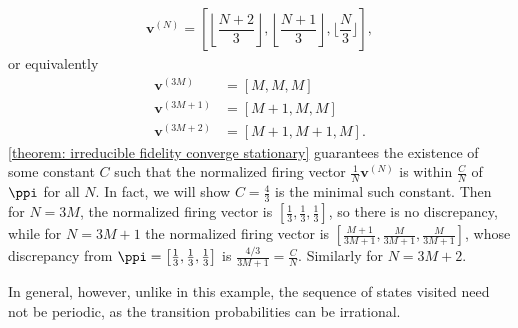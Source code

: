 \begin{example}
\begin{align*}
    \mathbf{v}^{(N)} = \left[\left\lfloor\dfrac{N+2}{3}\right\rfloor,\left\lfloor\dfrac{N+1}{3}\right\rfloor,\bigg\lfloor\dfrac{N}{3}\bigg\rfloor\right],
\end{align*}
or equivalently
\begin{align*}
    \mathbf{v}^{(3M)} &= \left[M,M,M\right] \\
    \mathbf{v}^{(3M+1)} &= \left[M+1,M,M\right] \\
    \mathbf{v}^{(3M+2)} &= \left[M+1,M+1,M\right].
\end{align*}
\cref{theorem: irreducible fidelity converge stationary} guarantees 
the existence of some constant $C$ such that 
the normalized firing vector $\frac{1}{N}\mathbf{v}^{(N)}$ 
is within $\frac{C}{N}$ of $\ppi$ for all $N$.
In fact, we will show $C=\frac{4}{3}$ is the minimal such constant.
Then for $N=3M$, the normalized firing vector is 
$\left[\frac{1}{3},\frac{1}{3},\frac{1}{3}\right]$, so there is no discrepancy,
while for $N=3M+1$ the normalized firing vector is 
$\left[\frac{M+1}{3M+1},\frac{M}{3M+1},\frac{M}{3M+1}\right]$, 
whose discrepancy from $\ppi=\left[\frac{1}{3},\frac{1}{3},\frac{1}{3}\right]$ 
is $\frac{4/3}{3M+1}=\frac{C}{N}$.
Similarly for $N=3M+2$.

In general, however, unlike in this example, 
the sequence of states visited need not be periodic, 
as the transition probabilities can be irrational.
\end{example}
